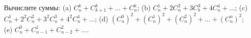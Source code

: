Вычислите суммы: (a) $C_n^k + C_{k+1}^k + \ldots + C_n^k$; \medskip (b) $C_n^1 + 2 C_n^2 + 3 C_b^3 + 4 C_n^4 + \ldots$; \medskip (c) $C_n^1 + 2^2 C_n^2 + 3^2 C_n^3 + 4^2 C_n^4 + \ldots$; \medskip (d) $(C_n^0)^2 + (C_n^1)^2 + (C_n^2)^2 + \ldots + (C_n^n)^2$; \medskip (e) $C_n^0 + C_{n-1}^1 + C_{n-2}^2 + \ldots$.